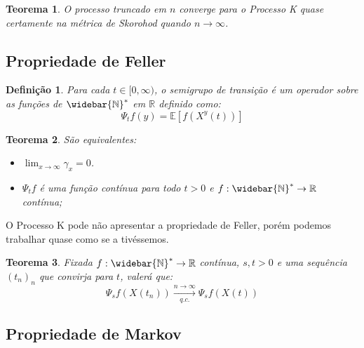 \documentclass[xcolor=pdftex,dvipsnames]{beamer}
\newcommand{\Nzb}{{\mathbb{\widebar{N}^*}}}
\newcommand{\R}{{\mathbb{R}}}
\newcommand{\E}{{\mathbb{E}}}
\newtheorem{teorema}{Teorema}
\newtheorem{definicao}{Definição}
\begin{document}
\begin{frame}
  \begin{teorema}
    O processo truncado em $n$ converge para o Processo K quase
    certamente na métrica de Skorohod quando $n \to \infty$.
  \end{teorema}
\end{frame}


\subsection{Propriedade de Feller}

\begin{frame}

  \begin{definicao}
    Para cada $t \in [0, \infty)$, o semigrupo de transição é um
    operador sobre as funções de $\Nzb$ em $\R$ definido como:
    \begin{displaymath}
      \Psi_t f (y) = \E \left[ f(X^y(t)) \right]
    \end{displaymath}
  \end{definicao} \pause

  \begin{teorema}
    São equivalentes:
    \begin{itemize}
    \item $\displaystyle \lim_{x \to \infty} \gamma_x = 0$.
    \item $\Psi_t f$ é uma função contínua para todo $t > 0$ e $f:
      \Nzb \to \R$ contínua;
    \end{itemize}
  \end{teorema}
\end{frame}

\begin{frame}
  O Processo K pode não apresentar a propriedade de Feller, porém
  podemos trabalhar quase como se a tivéssemos.
  \begin{teorema}
    Fixada $f: \Nzb \to \R$ contínua, $s, t > 0$ e uma sequência
    $(t_n)_n$ que convirja para $t$, valerá que:
    \begin{displaymath}
      \Psi_s f (X(t_n)) \xrightarrow[q.c.]{n \to \infty} \Psi_s f (X(t))
    \end{displaymath}
  \end{teorema}
\end{frame}

\subsection{Propriedade de Markov}
\end{document}
